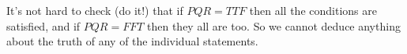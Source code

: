 It's not hard to check (do it!) that if $PQR=TTF$ then all the conditions are satisfied, and if $PQR=FFT$ then they all are too. So we cannot deduce anything about the truth of any of the individual statements.
